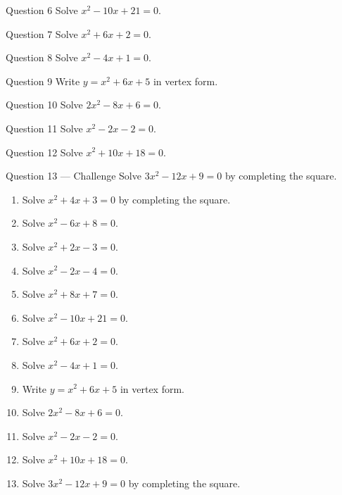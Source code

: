 \documentclass[11pt]{article}
\begin{document}
\begin{qbox}{Question 6}
Solve $x^2-10x+21=0$.\workspace{2.4cm}
\end{qbox}

\begin{qbox}{Question 7}
Solve $x^2+6x+2=0$.\workspace{2.4cm}
\end{qbox}

\begin{qbox}{Question 8}
Solve $x^2-4x+1=0$.\workspace{2.4cm}
\end{qbox}

\begin{qbox}{Question 9}
Write $y=x^2+6x+5$ in vertex form.\workspace{2.2cm}
\end{qbox}

\begin{qbox}{Question 10}
Solve $2x^2-8x+6=0$.\workspace{2.4cm}
\end{qbox}

\begin{qbox}{Question 11}
Solve $x^2-2x-2=0$.\workspace{2.4cm}
\end{qbox}

\begin{qbox}{Question 12}
Solve $x^2+10x+18=0$.\workspace{2.4cm}
\end{qbox}

\begin{qbox}{Question 13 --- Challenge}
Solve $3x^2-12x+9=0$ by completing the square.\workspace{2.8cm}
\end{qbox}

\clearpage
{}

\begin{recapbox}
\begin{multicols}{2}
\small
\begin{enumerate}[leftmargin=*,itemsep=3pt]
  \item Solve $x^2+4x+3=0$ by completing the square.
  \item Solve $x^2-6x+8=0$.
  \item Solve $x^2+2x-3=0$.
  \item Solve $x^2-2x-4=0$.
  \item Solve $x^2+8x+7=0$.
  \item Solve $x^2-10x+21=0$.
  \item Solve $x^2+6x+2=0$.
  \item Solve $x^2-4x+1=0$.
  \item Write $y=x^2+6x+5$ in vertex form.
  \item Solve $2x^2-8x+6=0$.
  \item Solve $x^2-2x-2=0$.
  \item Solve $x^2+10x+18=0$.
  \item Solve $3x^2-12x+9=0$ by completing the square.
\end{enumerate}
\end{multicols}
\end{recapbox}
\end{document}
